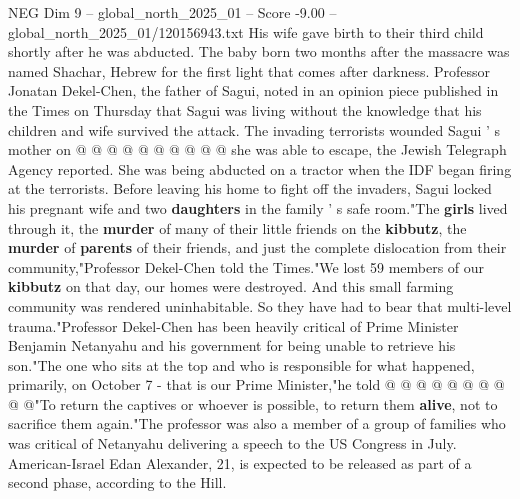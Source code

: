 \begin{textsample}{NEG Dim 9 – global\_north\_2025\_01 – Score -9.00 – global\_north\_2025\_01/120156943.txt}
His wife gave birth to their third child shortly after he was abducted.
The baby born two months after the massacre was named Shachar, Hebrew for the first light that comes after darkness.
Professor Jonatan Dekel-Chen, the father of Sagui, noted in an opinion piece published in the Times on Thursday that Sagui was living without the knowledge that his children and wife survived the attack.
The invading terrorists wounded Sagui ' s mother on @ @ @ @ @ @ @ @ @ @ she was able to escape, the Jewish Telegraph Agency reported.
She was being abducted on a tractor when the IDF began firing at the terrorists.
Before leaving his home to fight off the invaders, Sagui locked his pregnant wife and two \textbf{daughters} in the family ' s safe room."The \textbf{girls} lived through it, the \textbf{murder} of many of their little friends on the \textbf{kibbutz}, the \textbf{murder} of \textbf{parents} of their friends, and just the complete dislocation from their community,"Professor Dekel-Chen told the Times."We lost 59 members of our \textbf{kibbutz} on that day, our homes were destroyed.
And this small farming community was rendered uninhabitable.
So they have had to bear that multi-level trauma."Professor Dekel-Chen has been heavily critical of Prime Minister Benjamin Netanyahu and his government for being unable to retrieve his son."The one who sits at the top and who is responsible for what happened, primarily, on October 7 - that is our Prime Minister,"he told @ @ @ @ @ @ @ @ @ @"To return the captives or whoever is possible, to return them \textbf{alive}, not to sacrifice them again."The professor was also a member of a group of families who was critical of Netanyahu delivering a speech to the US Congress in July.
American-Israel Edan Alexander, 21, is expected to be released as part of a second phase, according to the Hill.

\end{textsample}
